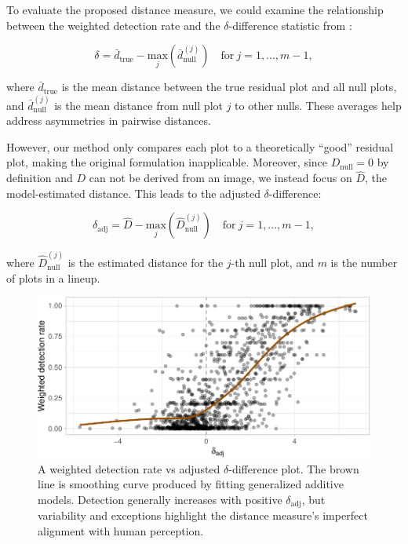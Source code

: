 \documentclass[]{interact}
\theoremstyle{plain}%
\theoremstyle{definition}
\theoremstyle{remark}
\begin{document}
To evaluate the proposed distance measure, we could examine the
relationship between the weighted detection rate and the
\(\delta\)-difference statistic from \citet{chowdhury2018measuring}:

\[
\delta = \bar{d}_{\text{true}} - \underset{j}{\text{max}}\left(\bar{d}_{\text{null}}^{(j)}\right) \quad \text{for}~j = 1,...,m-1,
\]

\noindent where \(\bar{d}_{\text{true}}\) is the mean distance between
the true residual plot and all null plots, and
\(\bar{d}_{\text{null}}^{(j)}\) is the mean distance from null plot
\(j\) to other nulls. These averages help address asymmetries in
pairwise distances.

However, our method only compares each plot to a theoretically ``good''
residual plot, making the original formulation inapplicable. Moreover,
since \(D_{\text{null}} = 0\) by definition and \(D\) can not be derived
from an image, we instead focus on \(\hat{D}\), the model-estimated
distance. This leads to the adjusted \(\delta\)-difference:

\[
\delta_{\text{adj}} = \hat{D} - \underset{j}{\text{max}}\left(\hat{D}_{\text{null}}^{(j)}\right) \quad \text{for}~j = 1,...,m-1,
\]

\noindent where \(\hat{D}_{\text{null}}^{(j)}\) is the estimated
distance for the \(j\)-th null plot, and \(m\) is the number of plots in
a lineup.

\begin{figure}[!h]

{\centering \includegraphics[width=0.8\linewidth]{paper_files/figure-latex/delta-1} 

}

\caption{A weighted detection rate vs adjusted $\delta$-difference plot. The brown line is smoothing curve produced by fitting generalized additive models. Detection generally increases with positive $\delta_{\text{adj}}$, but variability and exceptions highlight the distance measure's imperfect alignment with human perception.}\label{fig:delta}
\end{figure}
\end{document}
